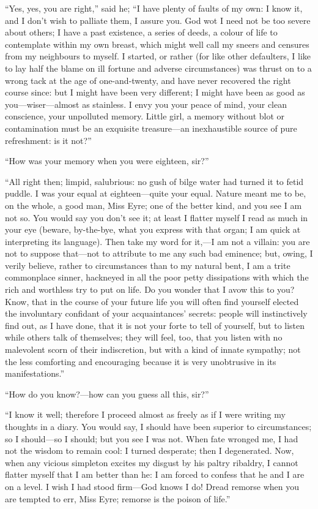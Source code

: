 \enquote{Yes, yes, you are right,} said he; \enquote{I have plenty of
faults of my own: I know it, and I don't wish to palliate them, I assure
you. God wot I need not be too severe about others; I have a past
existence, a series of deeds, a colour of life to contemplate within my
own breast, which might well call my sneers and censures from my
neighbours to myself. I started, or rather (for like other defaulters,
I like to lay half the blame on ill fortune and adverse circumstances)
was thrust on to a wrong tack at the age of one-and-twenty, and have
never recovered the right course since: but I might have been very
different; I might have been as good as you---wiser---almost as
stainless. I envy you your peace of mind, your clean conscience, your
unpolluted memory. Little girl, a memory without blot or contamination
must be an exquisite treasure---an inexhaustible source of pure
refreshment: is it not?}

\enquote{How was your memory when you were eighteen, sir?}

\enquote{All right then; limpid, salubrious: no gush of bilge water had
turned it to fetid puddle. I was your equal at eighteen---quite your
equal. Nature meant me to be, on the whole, a good man, Miss Eyre; one
of the better kind, and you see I am not so. You would say you don't
see it; at least I flatter myself I read as much in your eye (beware,
by-the-bye, what you express with that organ; I am quick at interpreting
its language). Then take my word for it,---I am not a villain: you are
not to suppose that---not to attribute to me any such bad eminence; but,
owing, I verily believe, rather to circumstances than to my natural
bent, I am a trite commonplace sinner, hackneyed in all the poor petty
dissipations with which the rich and worthless try to put on life. Do
you wonder that I avow this to you? Know, that in the course of your
future life you will often find yourself elected the involuntary
confidant of your acquaintances' secrets: people will instinctively find
out, as I have done, that it is not your forte to tell of yourself, but
to listen while others talk of themselves; they will feel, too, that you
listen with no malevolent scorn of their indiscretion, but with a kind
of innate sympathy; not the less comforting and encouraging because it
is very unobtrusive in its manifestations.}

\enquote{How do you know?---how can you guess all this, sir?}

\enquote{I know it well; therefore I proceed almost as freely as if I
were writing my thoughts in a diary. You would say, I should have been
superior to circumstances; so I should---so I should; but you see I was
not. When fate wronged me, I had not the wisdom to remain cool: I
turned desperate; then I degenerated. Now, when any vicious simpleton
excites my disgust by his paltry ribaldry, I cannot flatter myself that
I am better than he: I am forced to confess that he and I are on a
level. I wish I had stood firm---God knows I do! Dread remorse when
you are tempted to err, Miss Eyre; remorse is the poison of life.}

